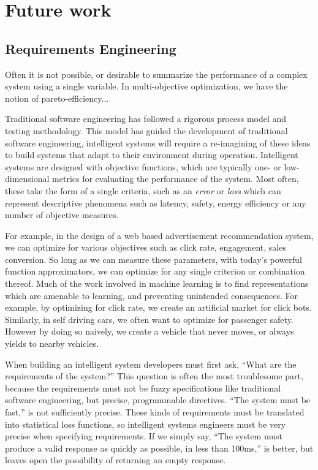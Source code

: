 \documentclass[12pt,initial,twoside,maitrise]{dms}
\numberwithin{equation}{section}
\numberwithin{table}{chapter}
\numberwithin{figure}{chapter}
\begin{document}
\section{Future work}

\subsection{Requirements Engineering}

Often it is not possible, or desirable to summarize the performance of a complex system using a single variable. In multi-objective optimization, we have the notion of pareto-efficiency...

Traditional software engineering has followed a rigorous process model and testing methodology. This model has guided the development of traditional software engineering, intelligent systems will require a re-imagining of these ideas to build systems that adapt to their environment during operation. Intelligent systems are designed with objective functions, which are typically one- or low-dimensional metrics for evaluating the performance of the system. Most often, these take the form of a single criteria, such as an \textit{error} or \textit{loss} which can represent descriptive phenomena such as latency, safety, energy efficiency or any number of objective measures.

For example, in the design of a web based advertisement recommendation system, we can optimize for various objectives such as click rate, engagement, sales conversion. So long as we can measure these parameters, with today's powerful function approximators, we can optimize for any single criterion or combination thereof. Much of the work involved in machine learning is to find representations which are amenable to learning, and preventing unintended consequences. For example, by optimizing for click rate, we create an artificial market for click bots. Similarly, in self driving cars, we often want to optimize for passenger safety. However by doing so naively, we create a vehicle that never moves, or always yields to nearby vehicles.

When building an intelligent system developers must first ask, ``What are the requirements of the system?'' This question is often the most troublesome part, because the requirements must not be fuzzy specifications like traditional software engineering, but precise, programmable directives. ``The system must be fast,'' is not sufficiently precise. These kinds of requirements must be translated into statistical loss functions, so intelligent systems engineers must be very precise when specifying requirements. If we simply say, ``The system must produce a valid response as quickly as possible, in less than 100ms,'' is better, but leaves open the possibility of returning an empty response.
\end{document}
